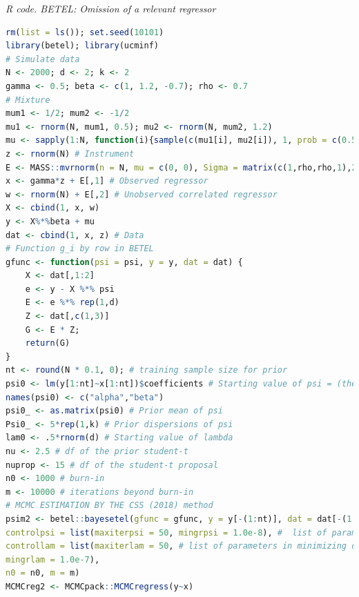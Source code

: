 \begin{enumerate}[leftmargin=*]
\begin{tcolorbox}[enhanced,width=4.67in,center upper,
	fontupper=\large\bfseries,drop shadow southwest,sharp corners]
	\textit{R code. BETEL: Omission of a relevant regressor}
	\begin{VF}
		\begin{lstlisting}[language=R]
rm(list = ls()); set.seed(10101)
library(betel); library(ucminf)
# Simulate data
N <- 2000; d <- 2; k <- 2
gamma <- 0.5; beta <- c(1, 1.2, -0.7); rho <- 0.7
# Mixture
mum1 <- 1/2; mum2 <- -1/2
mu1 <- rnorm(N, mum1, 0.5); mu2 <- rnorm(N, mum2, 1.2)
mu <- sapply(1:N, function(i){sample(c(mu1[i], mu2[i]), 1, prob = c(0.5, 0.5))})
z <- rnorm(N) # Instrument
E <- MASS::mvrnorm(n = N, mu = c(0, 0), Sigma = matrix(c(1,rho,rho,1),2,2))
x <- gamma*z + E[,1] # Observed regressor
w <- rnorm(N) + E[,2] # Unobserved correlated regressor
X <- cbind(1, x, w)
y <- X%*%beta + mu
dat <- cbind(1, x, z) # Data
# Function g_i by row in BETEL
gfunc <- function(psi = psi, y = y, dat = dat) {
	X <- dat[,1:2]
	e <- y - X %*% psi
	E <- e %*% rep(1,d)
	Z <- dat[,c(1,3)]
	G <- E * Z;
	return(G)
}
nt <- round(N * 0.1, 0); # training sample size for prior
psi0 <- lm(y[1:nt]~x[1:nt])$coefficients # Starting value of psi = (theta, v), v is the slack parameter in CSS (2018)
names(psi0) <- c("alpha","beta")
psi0_ <- as.matrix(psi0) # Prior mean of psi 
Psi0_ <- 5*rep(1,k) # Prior dispersions of psi
lam0 <- .5*rnorm(d) # Starting value of lambda
nu <- 2.5 # df of the prior student-t
nuprop <- 15 # df of the student-t proposal
n0 <- 1000 # burn-in
m <- 10000 # iterations beyond burn-in
# MCMC ESTIMATION BY THE CSS (2018) method
psim2 <- betel::bayesetel(gfunc = gfunc, y = y[-(1:nt)], dat = dat[-(1:nt),], psi0 = psi0, lam0 = lam0, psi0_ = psi0_, Psi0_ = Psi0_, nu = nu, nuprop = nuprop,
controlpsi = list(maxiterpsi = 50, mingrpsi = 1.0e-8), #  list of parameters in maximizing likelihood over psi
controllam = list(maxiterlam = 50, # list of parameters in minimizing dual over lambda
mingrlam = 1.0e-7),
n0 = n0, m = m)
MCMCreg2 <- MCMCpack::MCMCregress(y~x)
\end{lstlisting}
	\end{VF}
\end{tcolorbox} 


\end{enumerate}
